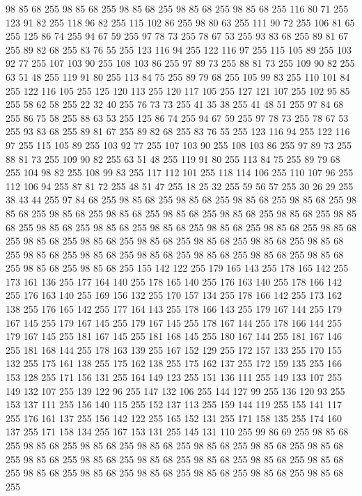 98 85 68 255 98 85 68 255 98 85 68 255 98 85 68 255 98 85 68 255 116 80 71 255 123 91 82 255 118 96 82 255 115 102 86 255 98 80 63 255 111 90 72 255 106 81 65 255 125 86 74 255 94 67 59 255 97 78 73 255 78 67 53 255 93 83 68 255 89 81 67 255 89 82 68 255 83 76 55 255 123 116 94 255 122 116 97 255 115 105 89 255 103 92 77 255 107 103 90 255 108 103 86 255 97 89 73 255 88 81 73 255 109 90 82 255 63 51 48 255 119 91 80 255 113 84 75 255 89 79 68 255 105 99 83 255 110 101 84 255 122 116 105 255 125 120 113 255 120 117 105 255 127 121 107 255 102 95 85 255 58 62 58 255 22 32 40 255 76 73 73 255 41 35 38 255 41 48 51 255 97 84 68 255 86 75 58 255 88 63 53 255 125 86 74 255 94 67 59 255 97 78 73 255 78 67 53 255 93 83 68 255 89 81 67 255 89 82 68 255 83 76 55 255 123 116 94 255 122 116 97 255 115 105 89 255 103 92 77 255 107 103 90 255 108 103 86 255 97 89 73 255 88 81 73 255
109 90 82 255 63 51 48 255 119 91 80 255 113 84 75 255 89 79 68 255 104 98 82 255 108 99 83 255 117 112 101 255 118 114 106 255 110 107 96 255 112 106 94 255 87 81 72 255 48 51 47 255 18 25 32 255 59 56 57 255 30 26 29 255 38 43 44 255 97 84 68 255 98 85 68 255 98 85 68 255 98 85 68 255 98 85 68 255 98 85 68 255 98 85 68 255 98 85 68 255 98 85 68 255 98 85 68 255 98 85 68 255 98 85 68 255 98 85 68 255 98 85 68 255 98 85 68 255 98 85 68 255 98 85 68 255 98 85 68 255 98 85 68 255 98 85 68 255 98 85 68 255 98 85 68 255 98 85 68 255 98 85 68 255 98 85 68 255 98 85 68 255 98 85 68 255 98 85 68 255 98 85 68 255 98 85 68 255 98 85 68 255 98 85 68 255 155 142 122 255 179 165 143 255 178 165 142 255 173 161 136 255 177 164 140 255 178 165 140 255 176 163 140 255 178 166 142 255 176 163 140 255 169 156 132 255 170 157 134 255 178 166 142 255 173 162 138 255 176 165 142 255 177 164 143 255
178 166 143 255 179 167 144 255 179 167 145 255 179 167 145 255 179 167 145 255 178 167 144 255 178 166 144 255 179 167 145 255 181 167 145 255 181 168 145 255 180 167 144 255 181 167 146 255 181 168 144 255 178 163 139 255 167 152 129 255 172 157 133 255 170 155 132 255 175 161 138 255 175 162 138 255 175 162 137 255 172 159 135 255 166 153 128 255 171 156 131 255 164 149 123 255 151 136 111 255 149 133 107 255 149 132 107 255 139 122 96 255 147 132 106 255 144 127 99 255 136 120 93 255 153 137 111 255 156 140 115 255 152 137 113 255 159 144 119 255 155 141 117 255 176 161 137 255 156 142 122 255 165 152 131 255 171 158 135 255 174 160 137 255 171 158 134 255 167 153 131 255 145 131 110 255 99 86 69 255 98 85 68 255 98 85 68 255 98 85 68 255 98 85 68 255 98 85 68 255 98 85 68 255 98 85 68 255 98 85 68 255 98 85 68 255 98 85 68 255 98 85 68 255 98 85 68 255 98 85 68 255 98 85 68 255 98 85 68 255 98 85 68 255 98 85 68 255 98 85 68 255 98 85 68 255
